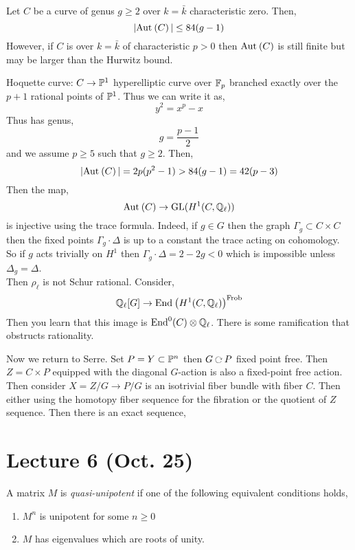 \documentclass[12pt]{article}
\begin{document}
Let $C$ be a curve of genus $g \ge 2$ over $k = \bar{k}$ characteristic zero. Then,
\[ |\Aut{C}| \le 84(g - 1) \]
However, if $C$ is over $k = \bar{k}$ of characteristic $p > 0$ then $\Aut{C}$ is still finite but may be larger than the Hurwitz bound.

\begin{example}
Hoquette curve: $C \to \P^1$ hyperelliptic curve over $\FF_p$ branched exactly over the $p+1$ rational points of $\P^1$. Thus we can write it as,
\[ y^2 = x^p - x \]
Thus has genus,
\[ g = \frac{p-1}{2} \]
and we assume $p \ge 5$ such that $g \ge 2$. Then,
\[ |\Aut{C}| = 2p(p^2 - 1) > 84 (g - 1) = 42 (p - 3) \]
Then the map,
\[ \Aut{C} \to \GL(H^1(C, \Q_\ell)) \]
is injective using the trace formula. Indeed, if $g \in G$ then the graph $\Gamma_g \subset C \times C$ then the fixed points $\Gamma_g \cdot \Delta$ is up to a constant the trace acting on cohomology. So if $g$ acts trivially on $H^1$ then $\Gamma_g \cdot \Delta = 2 - 2 g < 0$ which is impossible unless $\Delta_g = \Delta$. 
\bigskip\\
Then $\rho_{\ell}$ is not Schur rational. Consider,
\[ \Q_{\ell}[G] \to \End{H^1(C, \Q_\ell)}^{\Frob} \]
Then you learn that this image is $\mathrm{End}^0(C) \ot \Q_{\ell}$. There is some ramification that obstructs rationality. 
\end{example}

Now we return to Serre. Set $P = Y \subset \P^n$ then $G \acts P$ fixed point free. Then $Z  = C \times P$ equipped with the diagonal $G$-action is also a fixed-point free action. Then consider $X = Z / G \to P/G$ is an isotrivial fiber bundle with fiber $C$. Then either using the homotopy fiber sequence for the fibration or the quotient of $Z$ sequence. Then there is an exact sequence,
\begin{center}
\end{center}

\section{Lecture 6 (Oct. 25)}

\begin{defn}
A matrix $M$ is \textit{quasi-unipotent} if one of the following equivalent conditions holds,
\begin{enumerate}
\item $M^n$ is unipotent for some $n \ge 0$
\item $M$ has eigenvalues which are roots of unity.
\end{enumerate}
\end{defn}
\end{document}

